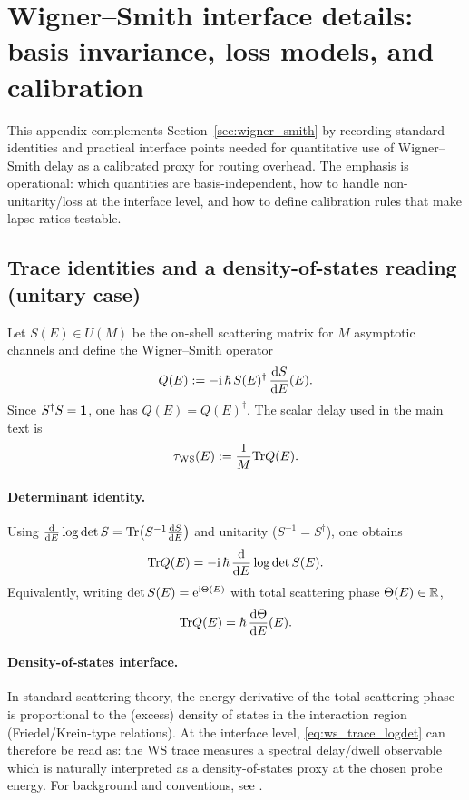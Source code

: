 \section{Wigner--Smith interface details: basis invariance, loss models, and calibration}
\label{app:ws_interface_details}

This appendix complements Section~\ref{sec:wigner_smith} by recording standard identities and practical interface points needed for quantitative use of Wigner--Smith delay as a calibrated proxy for routing overhead.
The emphasis is operational: which quantities are basis-independent, how to handle non-unitarity/loss at the interface level, and how to define calibration rules that make lapse ratios testable.

\subsection{Trace identities and a density-of-states reading (unitary case)}
\label{app:ws_trace_identities}

Let $S(E)\in U(M)$ be the on-shell scattering matrix for $M$ asymptotic channels and define the Wigner--Smith operator
\begin{equation}
  Q(E) := -\mathrm{i}\,\hbar\,S(E)^\dagger\,\frac{\mathrm{d} S}{\mathrm{d} E}(E).
\end{equation}
Since $S^\dagger S=\mathbf{1}$, one has $Q(E)=Q(E)^\dagger$.
The scalar delay used in the main text is
\begin{equation}
  \tau_{\mathrm{WS}}(E) := \frac{1}{M}\mathrm{Tr} Q(E).
\end{equation}

\paragraph{Determinant identity.}
Using $\frac{\mathrm{d}}{\mathrm{d} E}\log\det S=\mathrm{Tr}\!\left(S^{-1}\frac{\mathrm{d} S}{\mathrm{d} E}\right)$ and unitarity ($S^{-1}=S^\dagger$), one obtains
\begin{equation}
  \mathrm{Tr} Q(E) = -\mathrm{i}\,\hbar\,\frac{\mathrm{d}}{\mathrm{d} E}\log\det S(E).
  \label{eq:ws_trace_logdet}
\end{equation}
Equivalently, writing $\det S(E)=\mathrm{e}^{\mathrm{i}\Theta(E)}$ with total scattering phase $\Theta(E)\in\mathbb{R}$,
\begin{equation}
  \mathrm{Tr} Q(E)=\hbar\,\frac{\mathrm{d}\Theta}{\mathrm{d} E}(E).
\end{equation}

\paragraph{Density-of-states interface.}
In standard scattering theory, the energy derivative of the total scattering phase is proportional to the (excess) density of states in the interaction region (Friedel/Krein-type relations).
At the interface level, \eqref{eq:ws_trace_logdet} can therefore be read as: the WS trace measures a spectral delay/dwell observable which is naturally interpreted as a density-of-states proxy at the chosen probe energy.
For background and conventions, see \cite{Wigner1955,Smith1960,Datta1995,MahauxWeidenmueller1969}.

